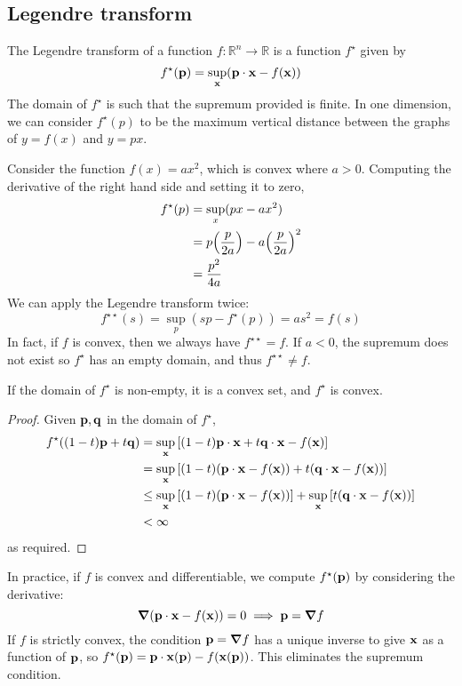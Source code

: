 \subsection{Legendre transform}
\begin{definition}
	The Legendre transform of a function \( f \colon \mathbb R^n \to \mathbb R \) is a function \( f^\star \) given by
	\[
		f^\star(\vb p) = \sup_{\vb x} (\vb p \cdot \vb x - f(\vb x))
	\]
	The domain of \( f^\star \) is such that the supremum provided is finite.
	In one dimension, we can consider \( f^\star(p) \) to be the maximum vertical distance between the graphs of \( y = f(x) \) and \( y = px \).
\end{definition}
\begin{example}
	Consider the function \( f(x) = ax^2 \), which is convex where \( a > 0 \).
	Computing the derivative of the right hand side and setting it to zero,
	\begin{align*}
		f^\star(p) & = \sup_x (px - ax^2)                           \\
		           & = p\qty(\frac{p}{2a}) - a \qty(\frac{p}{2a})^2 \\
		           & = \frac{p^2}{4a}
	\end{align*}
	We can apply the Legendre transform twice:
	\[
		f^{\star\star}(s) = \sup_p (sp - f^\star(p)) = as^2 = f(s)
	\]
	In fact, if \( f \) is convex, then we always have \( f^{\star\star} = f \).
	If \( a < 0 \), the supremum does not exist so \( f^\star \) has an empty domain, and thus \( f^{\star\star} \neq f \).
\end{example}
\begin{proposition}
	If the domain of \( f^\star \) is non-empty, it is a convex set, and \( f^\star \) is convex.
\end{proposition}
\begin{proof}
	Given \( \vb p, \vb q \) in the domain of \( f^\star \),
	\begin{align*}
		f^\star((1-t)\vb p + t \vb q) & = \sup_{\vb x} \qty[(1-t)\vb p \cdot \vb x + t \vb q \cdot \vb x - f(\vb x)]                                      \\
		                              & = \sup_{\vb x} \qty[(1-t)(\vb p \cdot \vb x - f(\vb x)) + t (\vb q \cdot \vb x - f(\vb x))]                       \\
		                              & \leq \sup_{\vb x} \qty[(1-t)(\vb p \cdot \vb x - f(\vb x))] + \sup_{\vb x} \qty[t (\vb q \cdot \vb x - f(\vb x))] \\
		                              & < \infty
	\end{align*}
	as required.
\end{proof}

\noindent In practice, if \( f \) is convex and differentiable, we compute \( f^\star(\vb p) \) by considering the derivative:
\[
	\grad(\vb p \cdot \vb x - f(\vb x)) = 0 \implies \vb p = \grad{f}
\]
If \( f \) is strictly convex, the condition \( \vb p = \grad{f} \) has a unique inverse to give \( \vb x \) as a function of \( \vb p \), so \( f^\star(\vb p) = \vb p \cdot \vb x(\vb p) - f(\vb x(\vb p)) \).
This eliminates the supremum condition.
